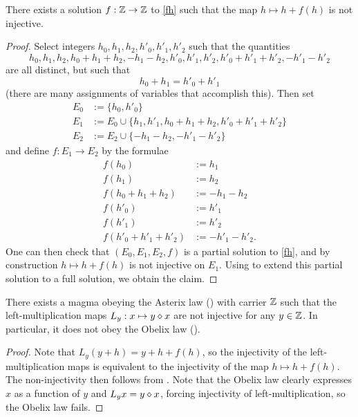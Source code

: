 \begin{corollary}\label{no-inject}  There exists a solution $f:\mathbb{Z} \to \mathbb{Z}$ to \eqref{fh} such that the map $h \mapsto h + f(h)$ is not injective.
\end{corollary}

\begin{proof}  Select integers $h_0,h_1,h_2,h'_0,h'_1,h'_2$ such that the quantities
  $$ h_0, h_1, h_2, h_0+h_1+h_2, -h_1-h_2, h'_0, h'_1, h'_2, h'_0+h'_1+h'_2, -h'_1-h'_2$$
  are all distinct, but such that
  $$ h_0 + h_1 = h'_0 + h'_1$$
  (there are many assignments of variables that accomplish this).  Then set
\begin{align*}
  E_0 &:= \{h_0, h'_0\}\\
  E_1 &:= E_0 \cup \{ h_1, h'_1, h_0+h_1+h_2, h'_0+h'_1+h'_2\}\\
  E_2 &:= E_2 \cup \{ -h_1-h_2, -h'_1-h'_2\}
\end{align*}
and define $f: E_1 \to E_2$ by the formulae
\begin{align*}
  f(h_0) &:= h_1 \\
  f(h_1) &:= h_2 \\
  f(h_0+h_1+h_2) &:= -h_1-h_2 \\
  f(h'_0) &:= h'_1 \\
  f(h'_1) &:= h'_2 \\
  f(h'_0+h'_1+h'_2) &:= -h'_1-h'_2.
\end{align*}
One can then check that $(E_0, E_1, E_2, f)$ is a partial solution to \eqref{fh}, and by construction $h \mapsto h + f(h)$ is not injective on $E_1$.  Using  to extend this partial solution to a full solution, we obtain the claim.
\end{proof}

\begin{corollary}\label{asterix-obelix}  There exists a magma obeying the Asterix law () with carrier $\mathbb{Z}$ such that the left-multiplication maps $L_y: x \mapsto y \diamond x$ are not injective for any $y \in \mathbb{Z}$.  In particular, it does not obey the Obelix law ().
\end{corollary}

\begin{proof} Note that $L_y (y+h) = y + h + f(h)$, so the injectivity of the left-multiplication maps is equivalent to the injectivity of the map $h \mapsto h + f(h)$.  The non-injectivity then follows from . Note that the Obelix law clearly expresses $x$ as a function of $y$ and $L_y x = y \diamond x$, forcing injectivity of left-multiplication, so the Obelix law fails.
\end{proof}

